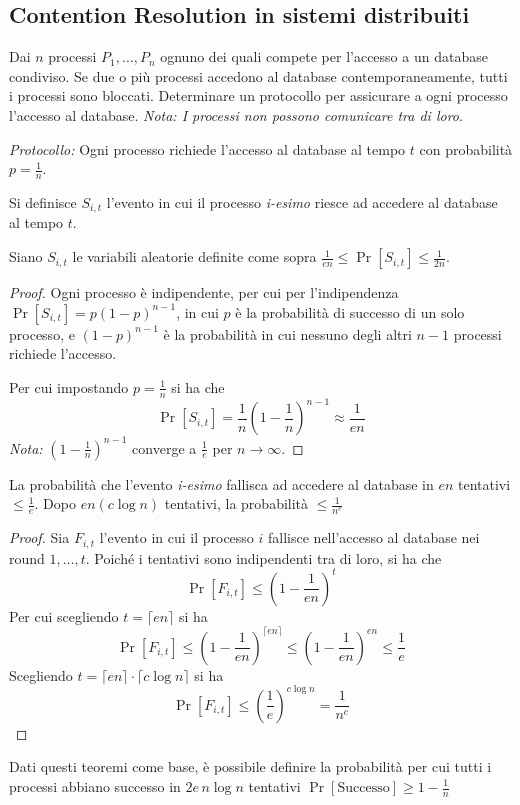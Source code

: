 \subsection{Contention Resolution in sistemi distribuiti}
Dai $n$ processi $P_1,\dots,P_n$ ognuno dei quali compete per l'accesso a un database condiviso. Se due o più processi accedono al database contemporaneamente, tutti i processi sono bloccati. Determinare un protocollo per assicurare a ogni processo l'accesso al database. \emph{Nota: I processi non possono comunicare tra di loro}.

\vspace{1em}\noindent
\emph{Protocollo:} Ogni processo richiede l'accesso al database al tempo $t$ con probabilità $p = \frac{1}{n}$.

Si definisce $S_{i,t}$ l'evento in cui il processo \emph{i-esimo} riesce ad accedere al database al tempo $t$. 
\begin{theorem}
    Siano $S_{i,t}$ le variabili aleatorie definite come sopra
    $\frac{1}{en} \leq \Pr[S_{i,t}] \leq \frac{1}{2n}$.
\end{theorem}

\begin{proof}
    Ogni processo è indipendente, per cui per l'indipendenza $\Pr[S_{i,t}] = p(1-p)^{n-1}$, in cui $p$ è la probabilità di successo di un solo processo, e $(1-p)^{n-1}$ è la probabilità in cui nessuno degli altri $n-1$ processi richiede l'accesso.

    \vspace{1em}
    Per cui impostando $p=\frac{1}{n}$ si ha che 
    \[
        \Pr\left[S_{i,t}\right] = \frac{1}{n}\left(1-\frac{1}{n}\right)^{n-1} \approx \boxed{\frac{1}{en}}
    \]
    \emph{Nota:} $\left( 1 - \frac{1}{n}\right)^{n-1}$ converge a $\frac{1}{e}$ per $n \to \infty$.
\end{proof}
\begin{theorem}
    La probabilità che l'evento \emph{i-esimo} fallisca ad accedere al database in $en$ tentativi $\leq \frac{1}{e}$. Dopo $en(c \log n)$ tentativi, la probabilità $\leq \frac{1}{n^c}$
\end{theorem}
\begin{proof}
    Sia $F_{i,t}$ l'evento in cui il processo $i$ fallisce nell'accesso al database nei round $1,\dots,t$. Poiché i tentativi sono indipendenti tra di loro, si ha che 
    \[
        \Pr[F_{i,t}] \leq \left(1- \frac{1}{en}\right)^t
        \]
        Per cui scegliendo $t = \lceil en \rceil$ si ha 
        \[
            \Pr[F_{i,t}] \leq \left(1-\frac{1}{en}\right)^{\lceil en \rceil} \leq \left(1-\frac{1}{en}\right)^{en} \leq \frac{1}{e}
            \]
            Scegliendo $t = \lceil en \rceil\cdot\lceil c \log n \rceil$ si ha 
            \[
                \Pr[F_{i,t}] \leq \left(\frac{1}{e}\right)^{c \log n} = \frac{1}{n^c}
            \]
\end{proof}
Dati questi teoremi come base, è possibile definire la probabilità per cui tutti i processi abbiano successo in $2e\, n \log n$ tentativi
$\Pr[\text{Successo}] \geq 1 - \frac{1}{n}$

